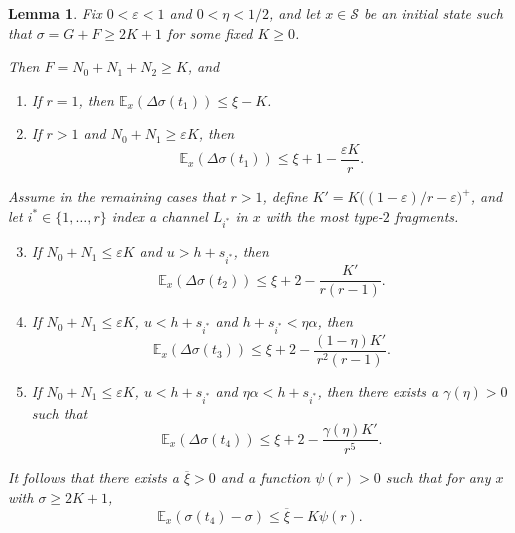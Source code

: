 \documentclass{amsart}
\def\E{\mathbb{E}}
\def\Scal{\mathcal{S}}
\newtheorem{lemma}{Lemma}
\begin{document}
\begin{lemma} \label{lemma:Delta}
Fix $0 < \varepsilon < 1$ and $0 < \eta < 1/2$, and  let $x \in
\Scal$ be an initial state such that $\sigma = G+F \geq 2K + 1$ for
some fixed $K \geq 0$.

Then $F = N_0 + N_1 + N_2 \geq K$,
and\renewcommand{\labelenumi}{\arabic{enumi})}
\begin{enumerate}
    \item If $r = 1$, then $\E_x(\Delta \sigma(t_1)) \leq \xi - K$.
\end{enumerate}

\begin{enumerate}\setcounter{enumi}{1}
    \item If $r>1$ and $N_0 + N_1 \geq \varepsilon K$, then
$$ \E_x(\Delta\sigma(t_1)) \leq \xi + 1 - \frac{\varepsilon
    K}{r}.$$
\end{enumerate}
Assume in the remaining cases that $r > 1$, define $K' =
K\big((1-\varepsilon)/ r - \varepsilon\big)^+$, and let $i^* \in
\{1, \ldots, r\}$ index a channel $L_{i^*}$ in $x$ with the most
type-$2$ fragments.
\begin{enumerate}\setcounter{enumi}{2}
        \item
If $N_0 + N_1 \leq \varepsilon K$ and $u > h + s_{i^*}$, then
        \begin{equation} \label{eq:case-N3-1}
        \E_x(\Delta\sigma(t_2)) \leq \xi + 2 - \frac{K'}{r(r-1)}.
        \end{equation}
        \item If $N_0 + N_1 \leq \varepsilon K$, $u < h + s_{i^*}$ and $h + s_{i^*} < \eta \alpha$,
        then
        \begin{equation} \label{eq:case-N3-2}
            \E_x(\Delta \sigma(t_3)) \leq \xi + 2 -
\frac{(1-\eta)K'}{r^2 (r - 1)}.
        \end{equation}
        \item If $N_0 + N_1 \leq \varepsilon K$, $u < h + s_{i^*}$ and $\eta \alpha
        < h + s_{i^*}$, then there exists a $\gamma(\eta) > 0$ such that
        \begin{equation} \label{eq:case-N3-3}
            \E_x(\Delta \sigma(t_4)) \leq \xi + 2 - \frac{\gamma(\eta) K'}{r^5}.
        \end{equation}
    \end{enumerate}
    It follows that there exists a $\overline \xi > 0$ and a function $\psi(r) > 0$
    such that for any $x$ with $\sigma \geq 2K+1$,
    \begin{equation} \label{eq:all}
        \E_x(\sigma(t_4) - \sigma) \leq \overline \xi - K \psi(r).
    \end{equation}
\end{lemma}
\end{document}
